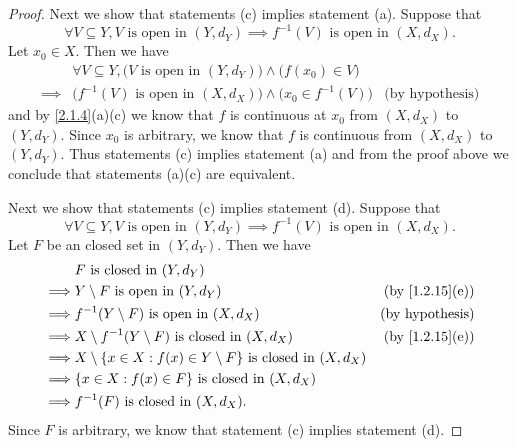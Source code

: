 \begin{proof}
  Next we show that statements (c) implies statement (a).
  Suppose that
  \[
    \forall V \subseteq Y, V \text{ is open in } (Y, d_Y) \implies f^{-1}(V) \text{ is open in } (X, d_X).
  \]
  Let \(x_0 \in X\).
  Then we have
  \begin{align*}
             & \forall V \subseteq Y, \big(V \text{ is open in } (Y, d_Y)\big) \land \big(f(x_0) \in V\big)                          \\
    \implies & \big(f^{-1}(V) \text{ is open in } (X, d_X)\big) \land \big(x_0 \in f^{-1}(V)\big)           & \text{(by hypothesis)}
  \end{align*}
  and by \cref{2.1.4}(a)(c) we know that \(f\) is continuous at \(x_0\) from \((X, d_X)\) to \((Y, d_Y)\).
  Since \(x_0\) is arbitrary, we know that \(f\) is continuous from \((X, d_X)\) to \((Y, d_Y)\).
  Thus statements (c) implies statement (a) and from the proof above we conclude that statements (a)(c) are equivalent.

  Next we show that statements (c) implies statement (d).
  Suppose that
  \[
    \forall V \subseteq Y, V \text{ is open in } (Y, d_Y) \implies f^{-1}(V) \text{ is open in } (X, d_X).
  \]
  Let \(F\) be an closed set in \((Y, d_Y)\).
  Then we have
  \begin{align*}
             & F \text{ is closed in } (Y, d_Y)                                                                               \\
    \implies & Y \setminus F \text{ is open in } (Y, d_Y)                                      & \text{(by \cref{1.2.15}(e))} \\
    \implies & f^{-1}(Y \setminus F) \text{ is open in } (X, d_X)                              & \text{(by hypothesis)}       \\
    \implies & X \setminus f^{-1}(Y \setminus F) \text{ is closed in } (X, d_X)                & \text{(by \cref{1.2.15}(e))} \\
    \implies & X \setminus \{x \in X : f(x) \in Y \setminus F\} \text{ is closed in } (X, d_X)                                \\
    \implies & \{x \in X : f(x) \in F\} \text{ is closed in } (X, d_X)                                                        \\
    \implies & f^{-1}(F) \text{ is closed in } (X, d_X).
  \end{align*}
  Since \(F\) is arbitrary, we know that statement (c) implies statement (d).


\end{proof}
